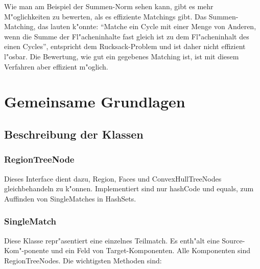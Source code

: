 Wie man am Beispiel der Summen-Norm sehen kann, gibt es mehr M"oglichkeiten zu bewerten, als es effiziente Matchings gibt. Das Summen-Matching, das lauten k"onnte: "`Matche ein Cycle mit  einer Menge von Anderen, wenn die Summe der Fl"acheninhalte fast gleich ist zu dem Fl"acheninhalt des einen Cycles"', entspricht dem Rucksack-Problem und ist daher nicht effizient l"osbar. Die Bewertung, wie gut ein gegebenes Matching ist, ist mit diesem Verfahren aber effizient m"oglich.

\section{Gemeinsame Grundlagen }
\subsection{Beschreibung der Klassen}
\subsubsection{RegionTreeNode}

Dieses Interface dient dazu, Region, Faces und ConvexHullTreeNodes gleichbehandeln zu k"onnen. Implementiert sind nur hashCode und equals, zum Auffinden von SingleMatches in HashSets.

\subsubsection{SingleMatch}
Diese Klasse repr"asentiert eine einzelnes Teilmatch.  Es enth"alt eine Source-Kom"-ponente und ein Feld von Target-Komponenten. Alle Komponenten sind RegionTreeNodes.
Die wichtigsten Methoden sind:

